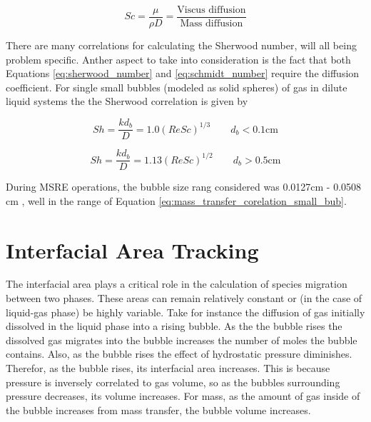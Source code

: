 \begin{equation}
	Sc = \frac{\mu}{\rho D} = \frac{\text{Viscus diffusion}}{\text{Mass diffusion}}
	\label{eq:schmidt_number}
\end{equation}

There are many correlations for calculating the Sherwood number, will all being problem specific. Anther aspect to take into consideration is the fact that both Equations \ref{eq:sherwood_number} and \ref{eq:schmidt_number} require the diffusion coefficient. For single small bubbles (modeled as solid spheres) of gas in dilute liquid systems the the Sherwood correlation is given by \cite{perry2007}

\begin{equation}
	Sh = \frac{k d_{b}}{D} = 1.0(Re Sc)^{1/3} \qquad d_{b} < 0.1\text{cm}
	\label{eq:mass_transfer_corelation_small_bub}
\end{equation}

\begin{equation}
	Sh = \frac{k d_{b}}{D} = 1.13(Re Sc)^{1/2} \qquad d_{b} >0.5\text{cm}
	\label{eq:mass_transfer_corelation_big_bub}
\end{equation}

During MSRE operations, the bubble size rang considered was 0.0127cm - 0.0508 cm \cite{engel1971}, well in the range of Equation \ref{eq:mass_transfer_corelation_small_bub}. 

\section{Interfacial Area Tracking}

The interfacial area plays a critical role in the calculation of species migration between two phases. These areas can remain relatively constant or (in the case of liquid-gas phase) be highly variable. Take for instance the diffusion of gas initially dissolved in the liquid phase into a rising bubble. As the the bubble rises the dissolved gas migrates into the bubble increases the number of moles the bubble contains. Also, as the bubble rises the effect of hydrostatic pressure diminishes. Therefor, as the bubble rises, its interfacial area increases. This is because pressure is inversely correlated to gas volume, so as the bubbles surrounding pressure decreases, its volume increases. For mass, as the amount of gas inside of the bubble increases from mass transfer, the bubble volume increases.

